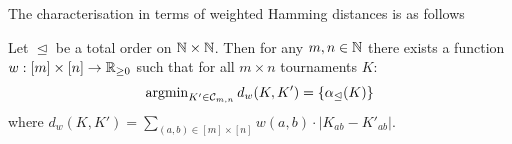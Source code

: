 The characterisation in terms of weighted Hamming distances is as follows

\begin{theorem}
   \label{tourn_prop_matchpref_weightings}

    Let $\trianglelefteq$ be a total order on $\mathbb{N} \times \mathbb{N}$. Then for any $m,
    n \in \mathbb{N}$ there exists a function $w: [m] \times [n] \to \mathbb{R}_{\ge 0}$ such
    that for all $m \times n$ tournaments $K$:
    \begin{equation}
        \label{tourn_eqn_matchpref_argmin}
        \operatorname{argmin}_{K' \in \mathcal{C}_{m,n}}{d_w(K, K')} = \{\alpha_{\trianglelefteq}(K)\}
    \end{equation}
    where $d_w(K, K') = \sum_{(a,b) \in [m] \times [n]}{w(a,b) \cdot |K_{ab} -
    K'_{ab}|}$.

\end{theorem}

